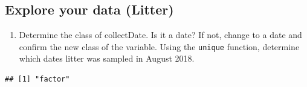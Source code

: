 \documentclass[]{article}
\newenvironment{Shaded}{\begin{snugshade}}{\end{snugshade}}
\newcommand{\KeywordTok}[1]{\textcolor[rgb]{0.13,0.29,0.53}{\textbf{#1}}}
\newcommand{\StringTok}[1]{\textcolor[rgb]{0.31,0.60,0.02}{#1}}
\newcommand{\OperatorTok}[1]{\textcolor[rgb]{0.81,0.36,0.00}{\textbf{#1}}}
\newcommand{\NormalTok}[1]{#1}
\providecommand{\tightlist}{%
  \setlength{\itemsep}{0pt}\setlength{\parskip}{0pt}}
\begin{document}
\subsection{Explore your data (Litter)}\label{explore-your-data-litter}

\begin{enumerate}
\def\labelenumi{\arabic{enumi}.}
\setcounter{enumi}{11}
\tightlist
\item
  Determine the class of collectDate. Is it a date? If not, change to a
  date and confirm the new class of the variable. Using the
  \texttt{unique} function, determine which dates litter was sampled in
  August 2018.
\end{enumerate}

\begin{Shaded}
\end{Shaded}

\begin{verbatim}
## [1] "factor"
\end{verbatim}

\begin{Shaded}
\end{Shaded}
\end{document}
